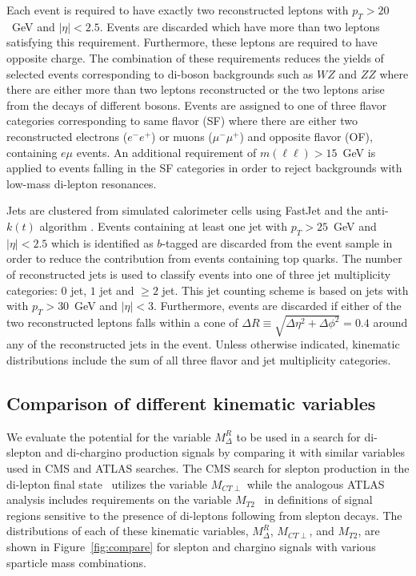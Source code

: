 Each event is required to have exactly two reconstructed leptons with $p_{T} > 20$~GeV and $|\eta| < 2.5$. Events are discarded which have more than two leptons satisfying this requirement. Furthermore, these leptons are required to have opposite charge. The combination of these requirements reduces the yields of selected events corresponding to di-boson backgrounds such as $WZ$ and $ZZ$ where there are either more than two leptons reconstructed or the two leptons arise from the decays of different bosons. Events are assigned to one of three flavor categories corresponding to same flavor (SF) where there are either two reconstructed electrons ($e^-e^+$) or muons ($\mu^-\mu^+$) and opposite flavor (OF), containing
$e\mu$ events. An additional requirement of $m(\ell\ell) > 15$~GeV is applied to events falling in the SF categories in order to reject backgrounds with low-mass di-lepton resonances.

Jets are clustered from simulated calorimeter cells using FastJet \cite{Cacciari:2011ma} and the anti-$k(t)$ algorithm \cite{Cacciari:2008gp}.
Events containing at least one jet with $p_{T} > 25$~GeV and $|\eta| < 2.5$ which is identified as $b$-tagged are discarded from the event sample in order to reduce the contribution from events containing top quarks. The number of reconstructed jets is used to classify events into one of three jet multiplicity categories: 0 jet, $1$ jet and $\ge 2$ jet. This jet counting scheme is based on jets with with $p_{T} > 30$~GeV and $|\eta| < 3$. Furthermore, events are discarded if either of the two reconstructed leptons falls within a cone of $\Delta R \equiv \sqrt{\Delta\eta^{2}+\Delta\phi^2} = 0.4$ around any of the reconstructed jets in the event. Unless otherwise indicated, kinematic distributions include the sum of all three flavor and jet multiplicity categories. 

\subsection{Comparison of different kinematic variables}

We evaluate the potential for the variable $M_{\Delta}^{R}$ to be used in a search for di-slepton and di-chargino production signals by comparing it with similar variables used in CMS and ATLAS searches. The CMS search for slepton production in the di-lepton final state~\cite{CMS-PAS-SUS-13-006} utilizes the variable $M_{CT\perp}$ \cite{Matchev:2009ad,Tovey:2008ui} while the analogous ATLAS analysis \cite{ATLAS-CONF-2013-049} includes requirements on the variable $M_{T2}$~\cite{Lester:1999tx,Barr:2003rg} in definitions of signal regions sensitive to the presence of di-leptons following from slepton decays. The distributions of each of these kinematic variables, $M_{\Delta}^{R}$, $M_{CT\perp}$, and $M_{T2}$, are shown in Figure~\ref{fig:compare} for slepton and chargino signals with various sparticle mass combinations.

